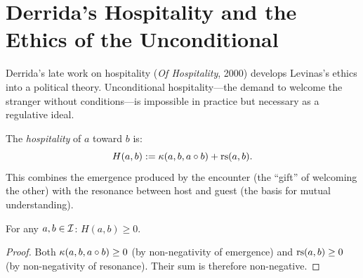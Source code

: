 \section{Derrida's Hospitality and the Ethics of the Unconditional}
\label{sec:hospitality}

Derrida's late work on hospitality (\textit{Of Hospitality}, 2000) develops
Levinas's ethics into a political theory. Unconditional hospitality---the
demand to welcome the stranger without conditions---is impossible in practice
but necessary as a regulative ideal.

\begin{definition}
\label{def:hospitality}
The \emph{hospitality} of $a$ toward $b$ is:
\[
H(a, b) := \kappa(a, b, a \circ b) + \mathrm{rs}(a, b).
\]
This combines the emergence produced by the encounter (the ``gift'' of
welcoming the other) with the resonance between host and guest (the basis
for mutual understanding).
\end{definition}

\begin{theorem}
\label{thm:hospitality-nonneg}
For any $a, b \in \mathcal{I}$: $H(a, b) \geq 0$.
\end{theorem}

\begin{proof}
Both $\kappa(a, b, a \circ b) \geq 0$ (by non-negativity of emergence)
and $\mathrm{rs}(a, b) \geq 0$ (by non-negativity of resonance). Their sum is
therefore non-negative.
\end{proof}

